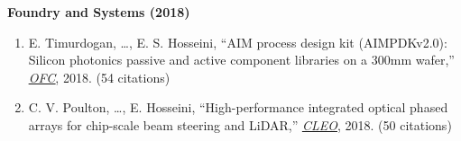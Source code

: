 \noindent\textbf{Foundry and Systems (2018)}
\begin{enumerate}
    \item E. Timurdogan, \ldots, E. S. Hosseini, ``AIM process design kit (AIMPDKv2.0): Silicon photonics passive and active component libraries on a 300mm wafer,''\newline
    \href{https://doi.org/10.1364/OFC.2018.M3F.1}{\underline{\textit{OFC}}}, 2018. (54 citations)
    \item C. V. Poulton, \ldots, E. Hosseini, ``High-performance integrated optical phased arrays for chip-scale beam steering and LiDAR,'' \href{https://doi.org/10.1364/CLEO_AT.2018.ATu3R.2}{\underline{\textit{CLEO}}}, 2018. (50 citations)
\end{enumerate}

\endgroup
